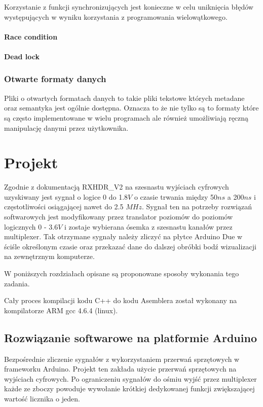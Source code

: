 \documentclass[a4paper,12pt]{article}
\begin{document}
Korzystanie z funkcji synchronizujących jest konieczne w celu uniknięcia błędów występujących w wyniku korzystania z programowania wielowątkowego.

\paragraph{Race condition}

\paragraph{Dead lock}


\subsubsection{Otwarte formaty danych}

Pliki o otwartych formatach danych to takie pliki tekstowe których metadane oraz semantyka jest ogólnie dostępna.
Oznacza to że nie tylko są to formaty które są często implementowane w wielu programach ale również umożliwiają ręczną manipulację danymi przez użytkownika.   
        
\section{Projekt}

Zgodnie z dokumentacją RXHDR\_V2 \cite{master} na szesnastu wyjściach cyfrowych uzyskiwany jest sygnał o logice 0 do 1.8$V$ o czasie trwania między 50$ns$ a 200$ns$ i częstotliwości osiągającej nawet do 2.5 $MHz$.
Sygnał ten na potrzeby rozwiązań softwarowych jest modyfikowany przez translator poziomów do poziomów logicznych 0 - 3.6$V$ i zostaje wybierana ósemka z szesnastu kanałów przez multiplexer.    
Tak otrzymane sygnały należy zliczyć na płytce Arduino Due w ściśle określonym czasie oraz przekazać dane do dalszej obróbki bodź wizualizacji na zewnętrznym komputerze.

W poniższych rozdziałach opisane są proponowane sposoby wykonania tego zadania. 

Cały proces kompilacji kodu C++ do kodu Asemblera został wykonany na kompilatorze ARM gcc 4.6.4 (linux). 

\subsection{Rozwiązanie softwarowe na platformie Arduino}
Bezpośrednie zliczenie sygnałów z wykorzystaniem przerwań sprzętowych w frameworku Arduino. Projekt ten zakłada użycie przerwań sprzętowych na wyjściach cyfrowych. 
Po ograniczeniu sygnałów do ośmiu wyjść przez multiplexer każde ze zboczy powoduje wywołanie krótkiej dedykowanej funkcji zwiększającej wartość licznika o jeden. 
\end{document}
